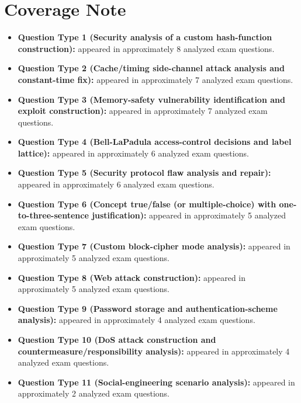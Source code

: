 \documentclass[12pt, a4paper]{article}
\begin{document}
\section*{Coverage Note}
\begin{itemize}
    \item \textbf{Question Type 1 (Security analysis of a custom hash-function construction):} appeared in approximately 8 analyzed exam questions.
    \item \textbf{Question Type 2 (Cache/timing side-channel attack analysis and constant-time fix):} appeared in approximately 7 analyzed exam questions.
    \item \textbf{Question Type 3 (Memory-safety vulnerability identification and exploit construction):} appeared in approximately 7 analyzed exam questions.
    \item \textbf{Question Type 4 (Bell-LaPadula access-control decisions and label lattice):} appeared in approximately 6 analyzed exam questions.
    \item \textbf{Question Type 5 (Security protocol flaw analysis and repair):} appeared in approximately 6 analyzed exam questions.
    \item \textbf{Question Type 6 (Concept true/false (or multiple-choice) with one-to-three-sentence justification):} appeared in approximately 5 analyzed exam questions.
    \item \textbf{Question Type 7 (Custom block-cipher mode analysis):} appeared in approximately 5 analyzed exam questions.
    \item \textbf{Question Type 8 (Web attack construction):} appeared in approximately 5 analyzed exam questions.
    \item \textbf{Question Type 9 (Password storage and authentication-scheme analysis):} appeared in approximately 4 analyzed exam questions.
    \item \textbf{Question Type 10 (DoS attack construction and countermeasure/responsibility analysis):} appeared in approximately 4 analyzed exam questions.
    \item \textbf{Question Type 11 (Social-engineering scenario analysis):} appeared in approximately 2 analyzed exam questions.
\end{itemize}
\end{document}
